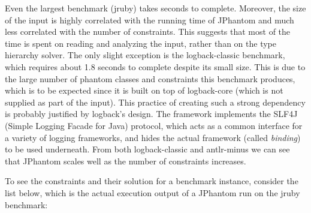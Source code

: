 Even the largest benchmark (jruby) takes seconds to
complete. Moreover, the size of the input is highly correlated with
the running time of JPhantom and much less correlated with the number
of constraints. This suggests that most of the time is spent on
reading and analyzing the input, rather than on the type hierarchy
solver. The only slight exception is the logback-classic benchmark,
which requires about 1.8 seconds to complete despite its small
size. This is due to the large number of phantom classes and
constraints this benchmark produces, which is to be expected since it
is built on top of logback-core (which is not supplied as part of the
input). This practice of creating such a strong dependency is probably
justified by logback's design. The framework implements the SLF4J
(Simple Logging Facade for Java) protocol, which acts as a common
interface for a variety of logging frameworks, and hides the actual
framework (called
\emph{binding}) to be used underneath. From both logback-classic and
antlr-minus we can see that JPhantom scales well as the number of
constraints increases.

To see the constraints and their solution for a benchmark instance,
consider the list below, which is the actual execution output of a
JPhantom run on the jruby benchmark:

